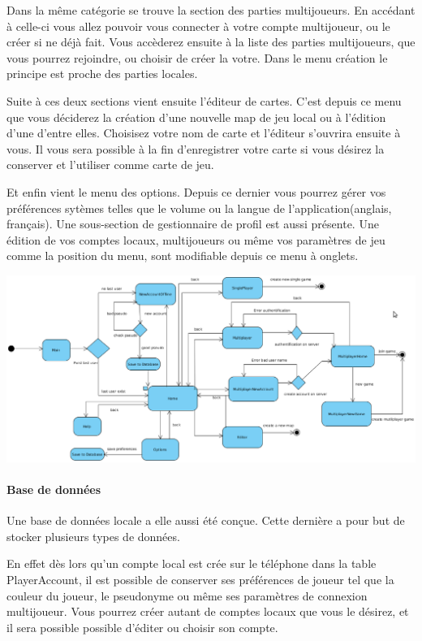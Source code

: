 \documentclass[a4paper,11pt]{report}
\begin{document}
		Dans la même catégorie se trouve la section des parties multijoueurs. En
		accédant à celle-ci vous allez pouvoir vous connecter à votre compte
		multijoueur, ou le créer si ne déjà fait. Vous accèderez ensuite à la liste
		des parties multijoueurs, que vous pourrez rejoindre, ou choisir de créer la
		votre. Dans le menu création le principe est proche des parties locales.
		
		Suite à ces deux sections vient ensuite l'éditeur de cartes. C'est depuis ce
		menu que vous déciderez la création d'une nouvelle map de jeu local ou à
		l'édition d'une d'entre elles. Choisisez votre nom de carte et l'éditeur
		s'ouvrira ensuite à vous. Il vous sera possible à la fin d'enregistrer votre
		carte si vous désirez la conserver et l'utiliser comme carte de jeu.
		
		Et enfin vient le menu des options. Depuis ce dernier vous pourrez gérer vos
		préférences sytèmes telles que le volume ou la langue de
		l'application(anglais, français).
		Une sous-section de gestionnaire de profil
		est aussi présente. Une édition de vos comptes locaux, multijoueurs ou même
		vos paramètres de jeu comme la position du menu, sont modifiable depuis ce
		menu à onglets.
		
		\begin{center}
			\label{activité}
			\includegraphics[width=23cm, angle=90]{./diagrammes/diag_activity.eps}
		\end{center}

				\paragraph{Base de données\\}
				
				Une base de données locale a elle aussi été conçue. Cette dernière a pour
				but de stocker plusieurs types de données.
				
				En effet dès lors qu'un compte local est crée sur le téléphone dans la
				table PlayerAccount, il est possible de conserver ses préférences de joueur
				tel que la couleur du joueur, le pseudonyme ou même ses paramètres de connexion multijoueur. 
				Vous pourrez créer autant de comptes locaux que vous le désirez, et il
				sera possible possible d'éditer ou choisir son compte.
				
\end{document}
